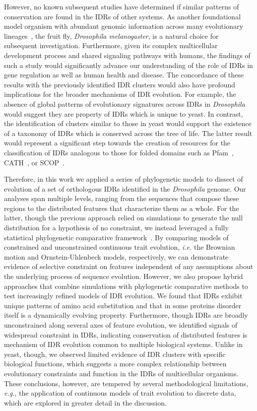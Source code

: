 However, no known subsequent studies have determined if similar patterns of conservation are found in the IDRs of other systems. As another foundational model organism with abundant genomic information across many evolutionary lineages~\cite{Yang2018, Miller2018, Kim2021, Gramates2022}, the fruit fly, \textit{Drosophila melanogaster}, is a natural choice for subsequent investigation. Furthermore, given its complex multicellular development process and shared signaling pathways with humans, the findings of such a study would significantly advance our understanding of the role of IDRs in gene regulation as well as human health and disease. The concordance of these results with the previously identified IDR clusters would also have profound implications for the broader mechanisms of IDR evolution. For example, the absence of global patterns of evolutionary signatures across IDRs in \textit{Drosophila} would suggest they are property of IDRs which is unique to yeast. In contrast, the identification of clusters similar to those in yeast would support the existence of a taxonomy of IDRs which is conserved across the tree of life. The latter result would represent a significant step towards the creation of resources for the classification of IDRs analogous to those for folded domains such as Pfam~\cite{Mistry2020}, CATH~\cite{Sillitoe2020}, or SCOP~\cite{Andreeva2013, Andreeva2019}.

Therefore, in this work we applied a series of phylogenetic models to dissect of evolution of a set of orthologous IDRs identified in the \textit{Drosophila} genome. Our analyses span multiple levels, ranging from the sequences that compose these regions to the distributed features that characterize them as a whole. For the latter, though the previous approach relied on simulations to generate the null distribution for a hypothesis of no constraint, we instead leveraged a fully statistical phylogenetic comparative framework~\cite{Cornwell2017}. By comparing models of constrained and unconstrained continuous trait evolution, \textit{i.e.} the Brownian motion and Ornstein-Uhlenbeck models, respectively, we can demonstrate evidence of selective constraint on features independent of any assumptions about the underlying process of sequence evolution. However, we also propose hybrid approaches that combine simulations with phylogenetic comparative methods to test increasingly refined models of IDR evolution. We found that IDRs exhibit unique patterns of amino acid substitution and that in some proteins disorder itself is a dynamically evolving property. Furthermore, though IDRs are broadly unconstrained along several axes of feature evolution, we identified signals of widespread constraint in IDRs, indicating conservation of distributed features is mechanism of IDR evolution common to multiple biological systems. Unlike in yeast, though, we observed limited evidence of IDR clusters with specific biological functions, which suggests a more complex relationship between evolutionary constraints and function in the IDRs of multicellular organisms. These conclusions, however, are tempered by several methodological limitations, \textit{e.g.}, the application of continuous models of trait evolution to discrete data, which are explored in greater detail in the discussion.

